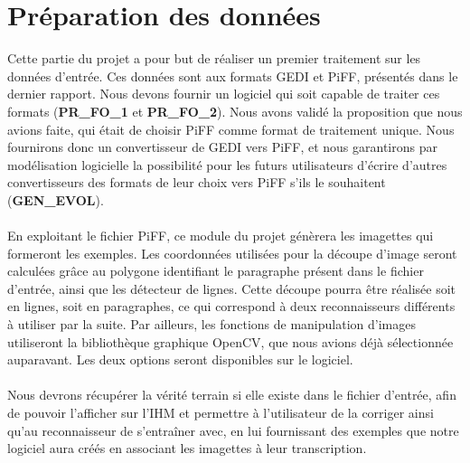 \section{Préparation des données}

Cette partie du projet a pour but de réaliser un premier traitement sur les
données d’entrée. Ces données sont aux formats GEDI et PiFF, présentés dans
le dernier rapport. Nous devons fournir un logiciel qui soit capable de
traiter ces formats (\textbf{PR_FO_1} et \textbf{PR_FO_2}). Nous avons validé
la proposition que nous avions faite, qui était de choisir PiFF comme format
de traitement unique. Nous fournirons donc un convertisseur de GEDI vers PiFF,
et nous garantirons par modélisation logicielle la possibilité pour les futurs
utilisateurs d’écrire d’autres convertisseurs des formats de leur choix vers
PiFF s’ils le souhaitent (\textbf{GEN_EVOL}).

\paragraph{}
En exploitant le fichier PiFF, ce module du projet génèrera les imagettes qui
formeront les exemples. Les coordonnées utilisées pour la découpe d’image seront
calculées grâce au polygone identifiant le paragraphe présent dans le fichier
d’entrée, ainsi que les détecteur de lignes. Cette découpe pourra être réalisée
soit en lignes, soit en paragraphes, ce qui correspond à deux reconnaisseurs
différents à utiliser par la suite. Par ailleurs, les fonctions de manipulation
d’images utiliseront la bibliothèque graphique OpenCV, que nous avions déjà
sélectionnée auparavant. Les deux options seront disponibles sur le logiciel.

\paragraph{}
Nous devrons récupérer la vérité terrain si elle existe dans le fichier d’entrée,
afin de pouvoir l’afficher sur l’IHM et permettre à l’utilisateur de la corriger
ainsi qu’au reconnaisseur de s’entraîner avec, en lui fournissant des exemples
que notre logiciel aura créés en associant les imagettes à leur transcription.